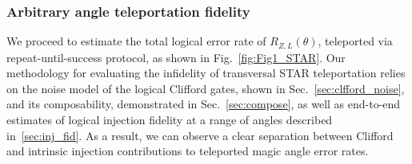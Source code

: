\documentclass[aps, prx, reprint, superscriptaddress, longbibliography, floatfix]{revtex4-2}
\begin{document}
\subsubsection{Arbitrary angle teleportation fidelity}
\label{sec:teleportation_fid}

We proceed to estimate the total logical error rate of $R_{Z,L}(\theta)$, teleported via repeat-until-success protocol, as shown in Fig.~\ref{fig:Fig1_STAR}. Our methodology for evaluating the infidelity of transversal STAR teleportation relies on the noise model of the logical Clifford gates, shown in Sec.~\ref{sec:clfford_noise}, and its composability, demonstrated in Sec.~\ref{sec:compose}, as well as end-to-end estimates of logical injection fidelity at a range of angles described in~\ref{sec:inj_fid}. As a result, we can observe a clear separation between Clifford and intrinsic injection contributions to teleported magic angle error rates.  
\end{document}
